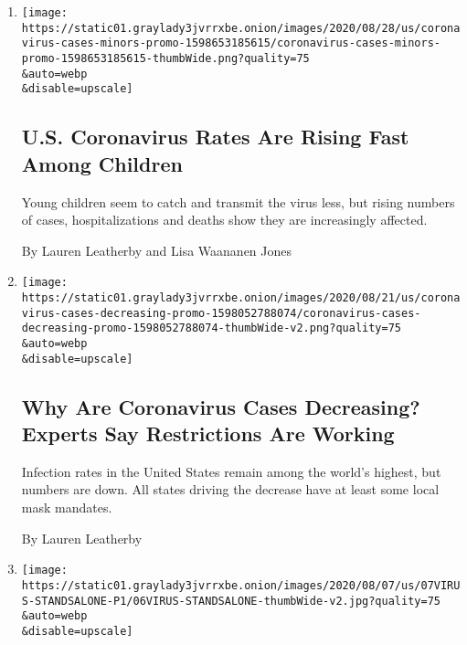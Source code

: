 \begin{enumerate}
\def\labelenumi{\arabic{enumi}.}
\item
  \href{/interactive/2020/08/31/us/coronavirus-cases-children.html}{}

  \texttt{[image: https://static01.graylady3jvrrxbe.onion/images/2020/08/28/us/coronavirus-cases-minors-promo-1598653185615/coronavirus-cases-minors-promo-1598653185615-thumbWide.png?quality=75\\\&auto=webp\\\&disable=upscale]}

  \hypertarget{us-coronavirus-rates-are-rising-fast-among-children}{%
  \subsection{U.S. Coronavirus Rates Are Rising Fast Among
  Children}\label{us-coronavirus-rates-are-rising-fast-among-children}}

  Young children seem to catch and transmit the virus less, but rising
  numbers of cases, hospitalizations and deaths show they are
  increasingly affected.

  By Lauren Leatherby and Lisa Waananen Jones
\item
  \href{/interactive/2020/08/24/us/coronavirus-cases-decreasing.html}{}

  \texttt{[image: https://static01.graylady3jvrrxbe.onion/images/2020/08/21/us/coronavirus-cases-decreasing-promo-1598052788074/coronavirus-cases-decreasing-promo-1598052788074-thumbWide-v2.png?quality=75\\\&auto=webp\\\&disable=upscale]}

  \hypertarget{why-are-coronavirus-cases-decreasing-experts-say-restrictions-are-working}{%
  \subsection{Why Are Coronavirus Cases Decreasing? Experts Say
  Restrictions Are
  Working}\label{why-are-coronavirus-cases-decreasing-experts-say-restrictions-are-working}}

  Infection rates in the United States remain among the world's highest,
  but numbers are down. All states driving the decrease have at least
  some local mask mandates.

  By Lauren Leatherby
\item
  \href{/2020/08/06/us/coronavirus-us.html}{}

  \texttt{[image: https://static01.graylady3jvrrxbe.onion/images/2020/08/07/us/07VIRUS-STANDSALONE-P1/06VIRUS-STANDSALONE-thumbWide-v2.jpg?quality=75\\\&auto=webp\\\&disable=upscale]}


\end{enumerate}
